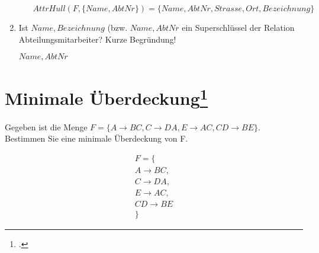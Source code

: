 \documentclass{lehramt-informatik-haupt}
\begin{document}
\begin{enumerate}
\begin{enumerate}
\begin{antwort}[richtig]
$AttrHull(F, \{Name, AbtNr\}) = \{Name, AbtNr, Strasse, Ort, Bezeichnung\}$
\end{antwort}
\end{enumerate}


\item Ist ${Name, Bezeichnung}$ (bzw. ${Name, AbtNr}$ ein Superschlüssel
der Relation Abteilungsmitarbeiter? Kurze Begründung!

\begin{antwort}[richtig]
${Name, AbtNr}$
\end{antwort}

\end{enumerate}

%

\section{Minimale Überdeckung\footcite[Seite 1, Aufgabe 2]{db:ab:5}}

Gegeben ist die Menge $F = \{A \rightarrow BC, C \rightarrow DA, E
\rightarrow AC, CD \rightarrow BE\}$. Bestimmen Sie eine minimale
Überdeckung von F.

\begin{multline*}
F = \{ \\
  A \rightarrow BC, \\
  C \rightarrow DA, \\
  E \rightarrow AC, \\
  CD \rightarrow BE \\
\}
\end{multline*}
\end{document}
